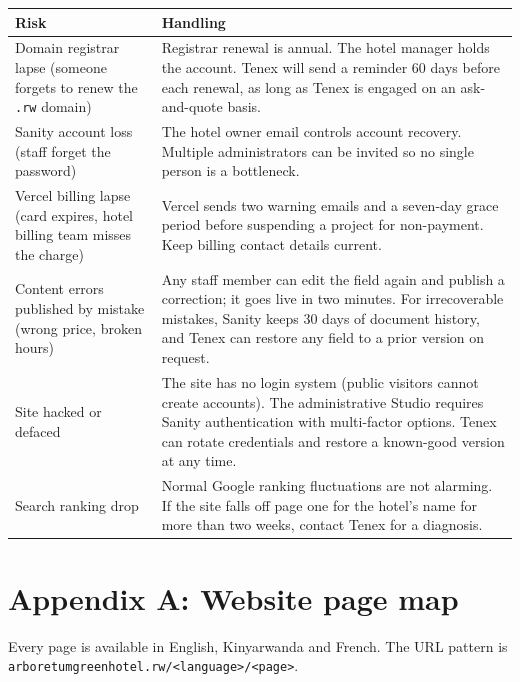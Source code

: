 \documentclass[11pt,a4paper]{article}
\begin{document}
\begin{tabularx}{\textwidth}{@{} X X @{}}
\toprule
\textbf{Risk} & \textbf{Handling} \\
\midrule
Domain registrar lapse (someone forgets to renew the \texttt{.rw} domain) & Registrar renewal is annual. The hotel manager holds the account. Tenex will send a reminder 60 days before each renewal, as long as Tenex is engaged on an ask-and-quote basis. \\
Sanity account loss (staff forget the password) & The hotel owner email controls account recovery. Multiple administrators can be invited so no single person is a bottleneck. \\
Vercel billing lapse (card expires, hotel billing team misses the charge) & Vercel sends two warning emails and a seven-day grace period before suspending a project for non-payment. Keep billing contact details current. \\
Content errors published by mistake (wrong price, broken hours) & Any staff member can edit the field again and publish a correction; it goes live in two minutes. For irrecoverable mistakes, Sanity keeps 30 days of document history, and Tenex can restore any field to a prior version on request. \\
Site hacked or defaced & The site has no login system (public visitors cannot create accounts). The administrative Studio requires Sanity authentication with multi-factor options. Tenex can rotate credentials and restore a known-good version at any time. \\
Search ranking drop & Normal Google ranking fluctuations are not alarming. If the site falls off page one for the hotel's name for more than two weeks, contact Tenex for a diagnosis. \\
\bottomrule
\end{tabularx}

\section*{Appendix A: Website page map}

Every page is available in English, Kinyarwanda and French. The URL pattern is \texttt{arboretumgreenhotel.\allowbreak rw/\allowbreak <language>/\allowbreak <page>}.
\end{document}
